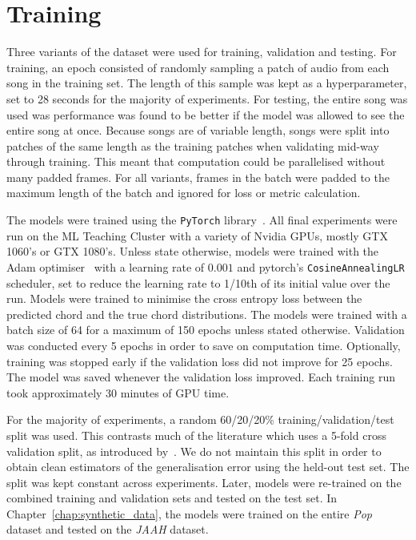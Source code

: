 \section{Training}

Three variants of the dataset were used for training, validation and testing. For training, an epoch consisted of randomly sampling a patch of audio from each song in the training set. The length of this sample was kept as a hyperparameter, set to 28 seconds for the majority of experiments. For testing, the entire song was used was performance was found to be better if the model was allowed to see the entire song at once. Because songs are of variable length, songs were split into patches of the same length as the training patches when validating mid-way through training. This meant that computation could be parallelised without many padded frames. For all variants, frames in the batch were padded to the maximum length of the batch and ignored for loss or metric calculation.

The models were trained using the \texttt{PyTorch} library~\citep{pytorch}. All final experiments were run on the ML Teaching Cluster with a variety of Nvidia GPUs, mostly GTX 1060's or GTX 1080's. Unless state otherwise, models were trained with the Adam optimiser~\citep{adam} with a learning rate of $0.001$ and pytorch's \texttt{CosineAnnealingLR} scheduler, set to reduce the learning rate to 1/10th of its initial value over the run. Models were trained to minimise the cross entropy loss between the predicted chord and the true chord distributions. The models were trained with a batch size of 64 for a maximum of 150 epochs unless stated otherwise. Validation was conducted every 5 epochs in order to save on computation time. Optionally, training was stopped early if the validation loss did not improve for 25 epochs. The model was saved whenever the validation loss improved. Each training run took approximately 30 minutes of GPU time. 

For the majority of experiments, a random 60/20/20\% training/validation/test split was used. This contrasts much of the literature which uses a 5-fold cross validation split, as introduced by~\citet{FourTimelyInsights}. We do not maintain this split in order to obtain clean estimators of the generalisation error using the held-out test set. The split was kept constant across experiments. Later, models were re-trained on the combined training and validation sets and tested on the test set. In Chapter~\ref{chap:synthetic_data}, the models were trained on the entire \emph{Pop} dataset and tested on the \emph{JAAH} dataset.